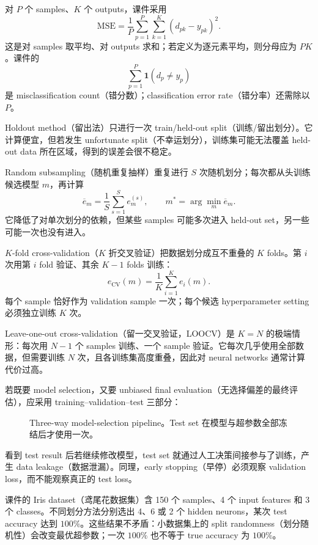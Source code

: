 对 $P$ 个 samples、$K$ 个 outputs，课件采用
\[
  \mathrm{MSE}=\frac1P\sum_{p=1}^{P}\sum_{k=1}^{K}(d_{pk}-y_{pk})^2.
\]
这是对 samples 取平均、对 outputs 求和；若定义为逐元素平均，则分母应为 $PK$。课件的
\[
  \sum_{p=1}^{P}\mathbf 1(d_p\ne y_p)
\]
是 misclassification count（错分数）；classification error rate（错分率）还需除以 $P$。


Holdout method（留出法）只进行一次 train/held-out split（训练/留出划分）。它计算便宜，但若发生 unfortunate split（不幸运划分），训练集可能无法覆盖 held-out data 所在区域，得到的误差会很不稳定。

Random subsampling（随机重复抽样）重复进行 $S$ 次随机划分；每次都从头训练候选模型 $m$，再计算
\[
  \overline e_m=\frac1S\sum_{s=1}^{S}e_m^{(s)},
  \qquad
  m^*=\arg\min_m\overline e_m.
\]
它降低了对单次划分的依赖，但某些 samples 可能多次进入 held-out set，另一些可能一次也没有进入。


$K$-fold cross-validation（$K$ 折交叉验证）把数据划分成互不重叠的 $K$ folds。第 $i$ 次用第 $i$ fold 验证、其余 $K-1$ folds 训练：
\[
  e_{\mathrm{CV}}(m)=\frac1K\sum_{i=1}^{K}e_i(m).
\]
每个 sample 恰好作为 validation sample 一次；每个候选 hyperparameter setting 必须独立训练 $K$ 次。

Leave-one-out cross-validation（留一交叉验证，LOOCV）是 $K=N$ 的极端情形：每次用 $N-1$ 个 samples 训练、一个 sample 验证。它每次几乎使用全部数据，但需要训练 $N$ 次，且各训练集高度重叠，因此对 neural networks 通常计算代价过高。


若既要 model selection，又要 unbiased final evaluation（无选择偏差的最终评估），应采用 training--validation--test 三部分：
\begin{figure}[htbp]
  \centering
  \resizebox{0.98\textwidth}{!}{}
  \caption{Three-way model-selection pipeline。Test set 在模型与超参数全部冻结后才使用一次。}
  \label{fig:sc4001-l05-selection-pipeline}
\end{figure}

看到 test result 后若继续修改模型，test set 就通过人工决策间接参与了训练，产生 data leakage（数据泄漏）。同理，early stopping（早停）必须观察 validation loss，而不能观察真正的 test loss。

课件的 Iris dataset（鸢尾花数据集）含 150 个 samples、4 个 input features 和 3 个 classes。不同划分方法分别选出 4、6 或 2 个 hidden neurons，某次 test accuracy 达到 $100\%$。这些结果不矛盾：小数据集上的 split randomness（划分随机性）会改变最优超参数；一次 $100\%$ 也不等于 true accuracy 为 $100\%$。

